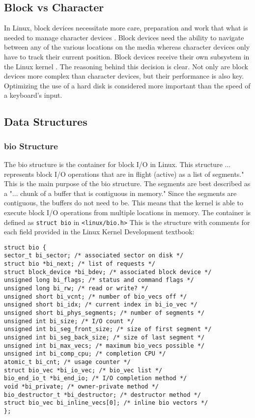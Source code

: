 \subsection{Block vs Character}
In Linux, block devices necessitate more care, preparation and work that what is needed to manage character devices \cite{LinuxTextbook}. Block devices need the ability to navigate between any of the various locations on the media whereas character devices only have to track their current position\cite{LinuxTextbook}. Block devices receive their own subsystem in the Linux kernel \cite{LinuxTextbook}. The reasoning behind this decision is clear. Not only are block devices more complex than character devices, but their performance is also key. Optimizing the use of a hard disk is considered more important than the speed of a keyboard's input.

\subsection{Data Structures}

\subsubsection{bio Structure}
The bio structure is the container for block I/O in Linux. This structure ... represents block I/O operations that are in flight (active) as a list of segments." \cite{LinuxTextbook} This is the main purpose of the bio structure. The segments are best described as a "... chunk of a buffer that is contiguous in memory." \cite{LinuxTextbook} Since the segments are contiguous, the buffers do not need to be. This means that the kernel is able to execute block I/O operations from multiple locations in memory. The container is defined as \lstinline{struct bio} in \lstinline{<linux/bio.h>} This is the structure with comments for each field provided in the Linux Kernel Development textbook:

\begin{lstlisting}
struct bio {
sector_t bi_sector; /* associated sector on disk */
struct bio *bi_next; /* list of requests */
struct block_device *bi_bdev; /* associated block device */
unsigned long bi_flags; /* status and command flags */
unsigned long bi_rw; /* read or write? */
unsigned short bi_vcnt; /* number of bio_vecs off */
unsigned short bi_idx; /* current index in bi_io_vec */
unsigned short bi_phys_segments; /* number of segments */
unsigned int bi_size; /* I/O count */
unsigned int bi_seg_front_size; /* size of first segment */
unsigned int bi_seg_back_size; /* size of last segment */
unsigned int bi_max_vecs; /* maximum bio_vecs possible */
unsigned int bi_comp_cpu; /* completion CPU */
atomic_t bi_cnt; /* usage counter */
struct bio_vec *bi_io_vec; /* bio_vec list */
bio_end_io_t *bi_end_io; /* I/O completion method */
void *bi_private; /* owner-private method */
bio_destructor_t *bi_destructor; /* destructor method */
struct bio_vec bi_inline_vecs[0]; /* inline bio vectors */
};
\end{lstlisting} \cite{LinuxTextbook}


